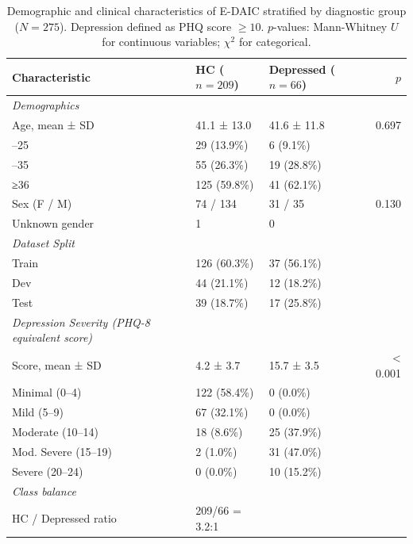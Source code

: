 \begin{table}[ht]
\centering
\small
\caption{Demographic and clinical characteristics of E-DAIC stratified by diagnostic group ($N=275$). Depression defined as PHQ score $\geq 10$. $p$-values: Mann-Whitney $U$ for continuous variables; $\chi^2$ for categorical.}
\label{tab:edaic_demographics}
\begin{tabular}{lllr}
\toprule
\textbf{Characteristic} & \textbf{HC ($n=209$)} & \textbf{Depressed ($n=66$)} & $p$ \\
\midrule
\textit{Demographics} & & & \\
Age, mean ± SD & 41.1 ± 13.0 & 41.6 ± 11.8 & 0.697 \\
\quad 18–25 & 29 (13.9\%) & 6 (9.1\%) &  \\
\quad 26–35 & 55 (26.3\%) & 19 (28.8\%) &  \\
\quad ≥36 & 125 (59.8\%) & 41 (62.1\%) &  \\
Sex (F / M) & 74 / 134 & 31 / 35 & 0.130 \\
\quad Unknown gender & 1 & 0 &  \\
\textit{Dataset Split} & & & \\
\quad Train & 126 (60.3\%) & 37 (56.1\%) &  \\
\quad Dev & 44 (21.1\%) & 12 (18.2\%) &  \\
\quad Test & 39 (18.7\%) & 17 (25.8\%) &  \\
\textit{Depression Severity (PHQ-8 equivalent score)} & & & \\
Score, mean ± SD & 4.2 ± 3.7 & 15.7 ± 3.5 & < 0.001 \\
\quad Minimal (0–4) & 122 (58.4\%) & 0 (0.0\%) &  \\
\quad Mild (5–9) & 67 (32.1\%) & 0 (0.0\%) &  \\
\quad Moderate (10–14) & 18 (8.6\%) & 25 (37.9\%) &  \\
\quad Mod. Severe (15–19) & 2 (1.0\%) & 31 (47.0\%) &  \\
\quad Severe (20–24) & 0 (0.0\%) & 10 (15.2\%) &  \\
\textit{Class balance} & & & \\
HC / Depressed ratio & 209/66 = 3.2:1 &  &  \\
\bottomrule
\end{tabular}
\end{table}